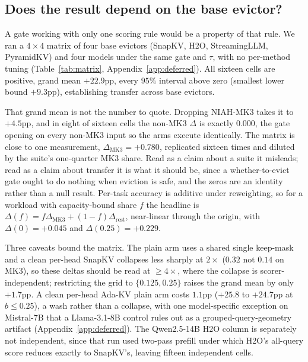 \documentclass{article}
\begin{document}
\subsection{Does the result depend on the base evictor?}
\label{subsec:matrix}

A gate working with only one scoring rule would be a property of that rule. We
ran a $4 \times 4$ matrix of four base evictors (SnapKV, H2O, StreamingLLM,
PyramidKV) and four models under the same gate and $\tau$, with no per-method
tuning (Table~\ref{tab:matrix}, Appendix~\ref{app:deferred}). All sixteen
cells are positive, grand mean $+22.9$pp, every $95\%$ interval above zero
(smallest lower bound $+9.3$pp), establishing transfer across base evictors.

That grand mean is not the number to quote. Dropping NIAH-MK3 takes it to
$+4.5$pp, and in eight of sixteen cells the non-MK3 $\Delta$ is exactly
$0.000$, the gate opening on every non-MK3 input so the arms execute
identically. The matrix is close to one measurement, $\Delta_{\mathrm{MK3}} =
+0.780$, replicated sixteen times and diluted by the suite's one-quarter MK3
share. Read as a claim about a suite it misleads; read as a claim about
transfer it is what it should be, since a whether-to-evict gate ought to do
nothing when eviction is safe, and the zeros are an identity rather than a
null result. Per-task accuracy is additive under reweighting, so
for a workload with capacity-bound share $f$ the headline is $\Delta(f) = f
\Delta_{\mathrm{MK3}} + (1-f) \Delta_{\mathrm{rest}}$, near-linear through the
origin, with $\Delta(0) = +0.045$ and $\Delta(0.25) = +0.229$.

Three caveats bound the matrix. The plain arm uses a shared single keep-mask
and a clean per-head SnapKV collapses less sharply at $2\times$ ($0.32$ not
$0.14$ on MK3), so these deltas should be read at $\ge 4\times$, where the
collapse is scorer-independent; restricting the grid to $\{0.125, 0.25\}$
raises the grand mean by only $+1.7$pp. A clean per-head Ada-KV plain arm
costs $1.1$pp ($+25.8$ to $+24.7$pp at $b \le 0.25$), a wash rather than a
collapse, with one model-specific exception on Mistral-7B that a Llama-3.1-8B
control rules out as a grouped-query-geometry artifact
(Appendix~\ref{app:deferred}). The Qwen2.5-14B H2O column is separately not
independent, since that run used two-pass prefill under which H2O's all-query
score reduces exactly to SnapKV's, leaving fifteen independent cells.
\end{document}
